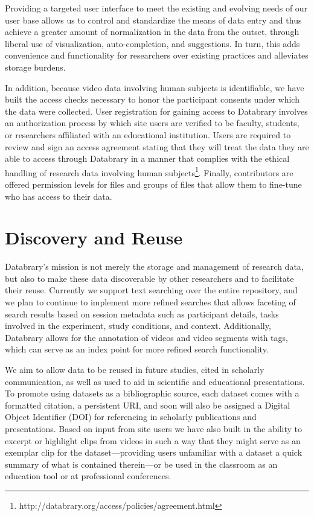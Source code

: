 \documentclass{sig-alternate}
\begin{document}
Providing a targeted user interface to meet the existing and evolving needs of our user base allows us to control and standardize the means of data entry and thus achieve a greater amount of normalization in the data from the outset, through liberal use of visualization, auto-completion, and suggestions.
In turn, this adds convenience and functionality for researchers over existing practices and alleviates storage burdens.

In addition, because video data involving human subjects is identifiable, we have built the access checks necessary to honor the participant consents under which the data were collected. 
User registration for gaining access to Databrary involves an authorization process by which site users are verified to be faculty, students, or researchers affiliated with an educational institution.
Users are required to review and sign an access agreement stating that they will treat the data they are able to access through Databrary in a manner that complies with the ethical handling of research data involving human subjects\footnote{http://databrary.org/access/policies/agreement.html}.
Finally, contributors are offered permission levels for files and groups of files that allow them to fine-tune who has access to their data. 

\section{Discovery and Reuse}

Databrary's mission is not merely the storage and management of research data, but also to make these data discoverable by other researchers and to facilitate their reuse.
Currently we support text searching over the entire repository, and we plan to continue to implement more refined searches that allows faceting of search results based on session metadata such as participant details, tasks involved in the experiment, study conditions, and context.
Additionally, Databrary allows for the annotation of videos and video segments with tags, which can serve as an index point for more refined search functionality.  

We aim to allow data to be reused in future studies, cited in scholarly communication, as well as used to aid in scientific and educational presentations.
To promote using datasets as a bibliographic source, each dataset comes with a formatted citation, a persistent URI, and soon will also be assigned a Digital Object Identifier (DOI) for referencing in scholarly publications and presentations.
Based on input from site users we have also built in the ability to excerpt or highlight clips from videos in such a way that they might serve as an exemplar clip for the dataset---providing users unfamiliar with a dataset a quick summary of what is contained therein---or be used in the classroom as an education tool or at professional conferences.
\end{document}
